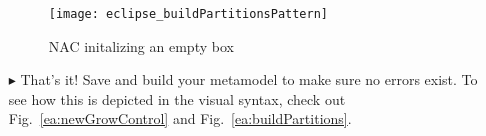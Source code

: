 \begin{itemize}
\clearpage

\vspace*{2cm}

\begin{figure}[htp]
\begin{center}
  \texttt{[image: eclipse\_buildPartitionsPattern]}
  \caption{NAC initalizing an empty box}
  \label{eclipse:pattBuildParts}
\end{center}
\end{figure}

\item[$\blacktriangleright$] That's it! Save and build your metamodel to make sure no errors exist. To see how this is depicted in the visual syntax, check out
Fig.~\ref{ea:newGrowControl} and Fig.~\ref{ea:buildPartitions}.

\end{itemize}
